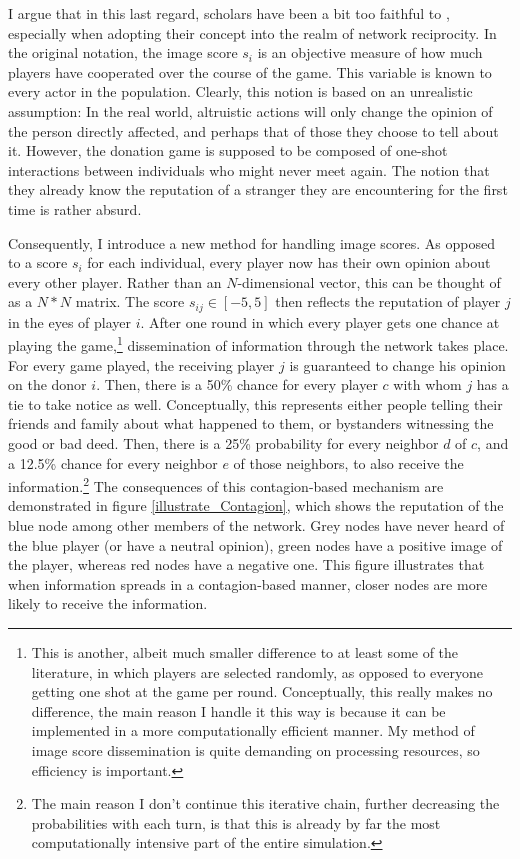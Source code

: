 \documentclass[12pt]{article}
\begin{document}
I argue that in this last regard, scholars have been a bit too faithful to \cite{Nowak1998}, especially when adopting their concept into the realm of network reciprocity. In the original notation, the image score $s_i$ is an objective measure of how much players have cooperated over the course of the game. This variable is known to every actor in the population. Clearly, this notion is based on an unrealistic assumption: In the real world, altruistic actions will only change the opinion of the person directly affected, and perhaps that of those they choose to tell about it. However, the donation game is supposed to be composed of one-shot interactions between individuals who might never meet again. The notion that they already know the reputation of a stranger they are encountering for the first time is rather absurd.

Consequently, I introduce a new method for handling image scores. As opposed to a score $s_i$ for each individual, every player now has their own opinion about every other player. Rather than an $N$-dimensional vector, this can be thought of as a $N*N$ matrix. The score $s_{ij}\in [-5,5]$ then reflects the reputation of player $j$ in the eyes of player $i$. After one round in which every player gets one chance at playing the game,\footnote{This is another, albeit much smaller difference to at least some of the literature, in which players are selected randomly, as opposed to everyone getting one shot at the game per round. Conceptually, this really makes no difference, the main reason I handle it this way is because it can be implemented in a more computationally efficient manner. My method of image score dissemination is quite demanding on processing resources, so efficiency is important.} dissemination of information through the network takes place. For every game played, the receiving player $j$ is guaranteed to change his opinion on the donor $i$. Then, there is a 50\% chance for every player $c$ with whom $j$ has a tie to take notice as well. Conceptually, this represents either people telling their friends and family about what happened to them, or bystanders witnessing the good or bad deed. Then, there is a 25\% probability for every neighbor $d$ of $c$, and a 12.5\% chance for every neighbor $e$ of those neighbors, to also receive the information.\footnote{The main reason I don't continue this iterative chain, further decreasing the probabilities with each turn, is that this is already by far the most computationally intensive part of the entire simulation.} The consequences of this contagion-based mechanism are demonstrated in figure \ref{illustrate_Contagion}, which shows the reputation of the blue node among other members of the network. Grey nodes have never heard of the blue player (or have a neutral opinion), green nodes have a positive image of the player, whereas red nodes have a negative one. This figure illustrates that when information spreads in a contagion-based manner, closer nodes are more likely to receive the information.
\end{document}
